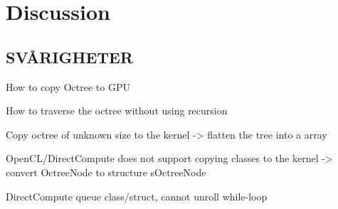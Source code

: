 
\chapter{Discussion}


\section{SVÅRIGHETER}

How to copy Octree to GPU

How to traverse the octree without using recursion

Copy octree of unknown size to the kernel -> flatten the tree into a array
 
OpenCL/DirectCompute does not support copying classes to the kernel -> convert OctreeNode to structure sOctreeNode
 
DirectCompute queue class/struct, cannot unroll while-loop